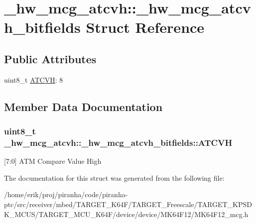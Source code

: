 \hypertarget{struct__hw__mcg__atcvh_1_1__hw__mcg__atcvh__bitfields}{}\section{\+\_\+hw\+\_\+mcg\+\_\+atcvh\+:\+:\+\_\+hw\+\_\+mcg\+\_\+atcvh\+\_\+bitfields Struct Reference}
\label{struct__hw__mcg__atcvh_1_1__hw__mcg__atcvh__bitfields}
\subsection*{Public Attributes}
\begin{DoxyCompactItemize}
\item 
uint8\+\_\+t \hyperlink{struct__hw__mcg__atcvh_1_1__hw__mcg__atcvh__bitfields_a87140019de68253005c7bac3db488218}{A\+T\+C\+VH}\+: 8
\end{DoxyCompactItemize}


\subsection{Member Data Documentation}
\subsubsection[{\texorpdfstring{A\+T\+C\+VH}{ATCVH}}]{\setlength{\rightskip}{0pt plus 5cm}uint8\+\_\+t \+\_\+hw\+\_\+mcg\+\_\+atcvh\+::\+\_\+hw\+\_\+mcg\+\_\+atcvh\+\_\+bitfields\+::\+A\+T\+C\+VH}\hypertarget{struct__hw__mcg__atcvh_1_1__hw__mcg__atcvh__bitfields_a87140019de68253005c7bac3db488218}{}\label{struct__hw__mcg__atcvh_1_1__hw__mcg__atcvh__bitfields_a87140019de68253005c7bac3db488218}
\mbox{[}7\+:0\mbox{]} A\+TM Compare Value High 

The documentation for this struct was generated from the following file\+:\begin{DoxyCompactItemize}
\item 
/home/erik/proj/piranha/code/piranha-\/ptc/src/receiver/mbed/\+T\+A\+R\+G\+E\+T\+\_\+\+K64\+F/\+T\+A\+R\+G\+E\+T\+\_\+\+Freescale/\+T\+A\+R\+G\+E\+T\+\_\+\+K\+P\+S\+D\+K\+\_\+\+M\+C\+U\+S/\+T\+A\+R\+G\+E\+T\+\_\+\+M\+C\+U\+\_\+\+K64\+F/device/device/\+M\+K64\+F12/M\+K64\+F12\+\_\+mcg.\+h\end{DoxyCompactItemize}
